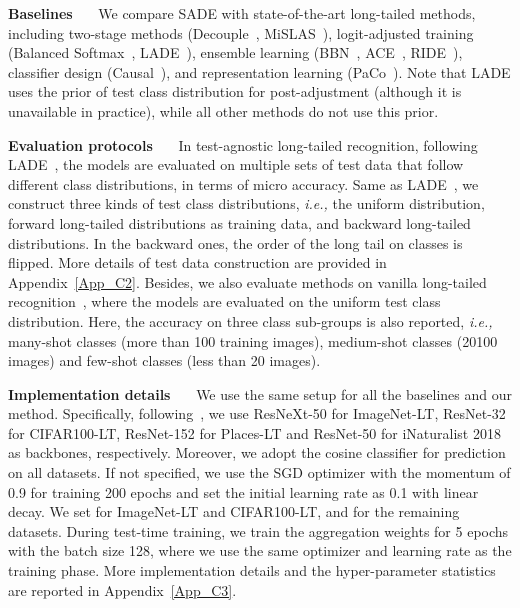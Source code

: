 \documentclass{article}
\def\ie{\emph{i.e.}} \def\Ie{\emph{I.e.}}
\def\ie{\emph{i.e., }}
\begin{document}
 
 
 
\textbf{Baselines}~~~
We  compare SADE with   state-of-the-art long-tailed methods, including two-stage methods (Decouple~\cite{kang2019decoupling},  MiSLAS~\cite{zhong2021improving}), logit-adjusted training (Balanced Softmax~\cite{jiawei2020balanced}, LADE~\cite{hong2020disentangling}),  ensemble learning (BBN~\cite{zhou2020bbn}, ACE~\cite{cai2021ace}, RIDE~\cite{wang2020long}), classifier design (Causal~\cite{tang2020long}),  and representation learning (PaCo~\cite{cui2021parametric}). Note that LADE uses  the prior of test class distribution    for post-adjustment (although it is unavailable in practice), while all other methods do not use this   prior.
  
\textbf{Evaluation protocols}~~~
In  test-agnostic long-tailed recognition, following LADE~\cite{hong2020disentangling}, the  models are  evaluated on multiple sets of test data that  follow  different class distributions,  in terms of micro accuracy.  Same as LADE~\cite{hong2020disentangling}, we construct three kinds of test class distributions, \ie the uniform  distribution, forward long-tailed distributions as training data, and backward long-tailed distributions. In the backward ones, the order of the long tail on  classes  is flipped. More details of test data construction are provided in Appendix~\ref{App_C2}.  
Besides, we also evaluate   methods on  vanilla long-tailed recognition~\cite{kang2019decoupling,liu2019large}, where the  models are evaluated on the uniform test class distribution. 
Here, the   accuracy on three class sub-groups is also   reported, \ie many-shot classes (more than 100 training images), medium-shot classes (20100 images) and few-shot classes (less than 20 images).


 \textbf{Implementation details}~~~
 We use the same setup for all the baselines and our method.  Specifically, following~\cite{hong2020disentangling,wang2020long}, we use ResNeXt-50 for ImageNet-LT, ResNet-32 for CIFAR100-LT, ResNet-152 for Places-LT and ResNet-50 for iNaturalist 2018 as   backbones, respectively. Moreover, we adopt the cosine classifier for prediction on all datasets. If not specified, we use the SGD optimizer with the momentum of 0.9 for training 200 epochs and set the initial
learning rate as 0.1 with linear decay. We set  for ImageNet-LT and CIFAR100-LT, and   for the remaining datasets.  During  test-time training, we train the aggregation weights for 5 epochs with the batch size 128, where we  use the same  optimizer and learning rate as the training phase. More implementation details and the hyper-parameter statistics  are reported in Appendix~\ref{App_C3}.
 
\end{document}
